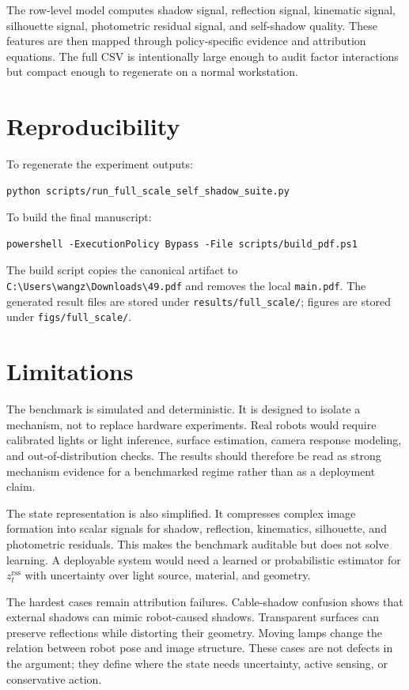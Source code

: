 \documentclass{article}
\newcommand{\rss}{z^{\mathrm{rss}}}
\begin{document}
The row-level model computes shadow signal, reflection signal, kinematic signal, silhouette signal, photometric residual signal, and self-shadow quality. These features are then mapped through policy-specific evidence and attribution equations. The full CSV is intentionally large enough to audit factor interactions but compact enough to regenerate on a normal workstation.

\section{Reproducibility}

To regenerate the experiment outputs:
\begin{verbatim}
python scripts/run_full_scale_self_shadow_suite.py
\end{verbatim}
To build the final manuscript:
\begin{verbatim}
powershell -ExecutionPolicy Bypass -File scripts/build_pdf.ps1
\end{verbatim}
The build script copies the canonical artifact to \texttt{C:\textbackslash Users\textbackslash wangz\textbackslash Downloads\textbackslash 49.pdf} and removes the local \texttt{main.pdf}. The generated result files are stored under \texttt{results/full\_scale/}; figures are stored under \texttt{figs/full\_scale/}.

\section{Limitations}

The benchmark is simulated and deterministic. It is designed to isolate a mechanism, not to replace hardware experiments. Real robots would require calibrated lights or light inference, surface estimation, camera response modeling, and out-of-distribution checks. The results should therefore be read as strong mechanism evidence for a benchmarked regime rather than as a deployment claim.

The state representation is also simplified. It compresses complex image formation into scalar signals for shadow, reflection, kinematics, silhouette, and photometric residuals. This makes the benchmark auditable but does not solve learning. A deployable system would need a learned or probabilistic estimator for $\rss_t$ with uncertainty over light source, material, and geometry.

The hardest cases remain attribution failures. Cable-shadow confusion shows that external shadows can mimic robot-caused shadows. Transparent surfaces can preserve reflections while distorting their geometry. Moving lamps change the relation between robot pose and image structure. These cases are not defects in the argument; they define where the state needs uncertainty, active sensing, or conservative action.
\end{document}

